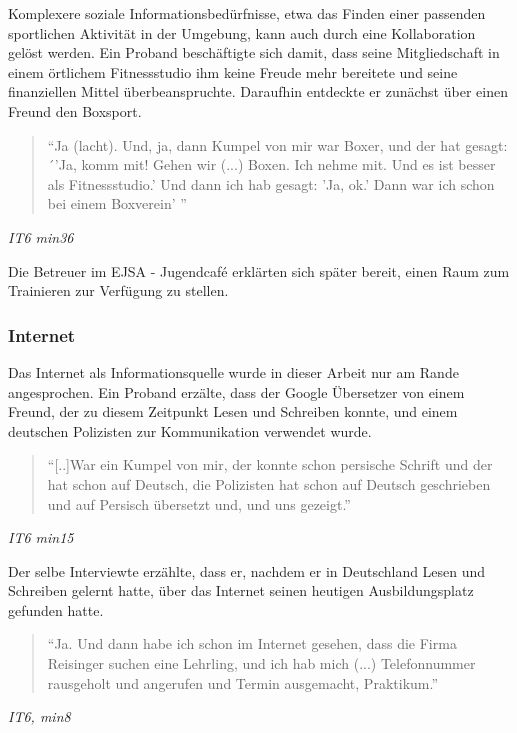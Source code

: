 Komplexere soziale Informationsbedürfnisse, etwa das Finden einer passenden sportlichen Aktivität in der Umgebung, kann auch durch eine Kollaboration gelöst werden. Ein Proband beschäftigte sich damit, dass seine Mitgliedschaft in einem örtlichem Fitnessstudio  ihm keine Freude mehr bereitete und seine finanziellen Mittel überbeanspruchte. Daraufhin entdeckte er zunächst über einen Freund den Boxsport.
\begin{quote}
    ``Ja (lacht). Und, ja, dann Kumpel von mir war Boxer, und der hat gesagt: ´'Ja, komm mit! Gehen wir (...) Boxen. Ich nehme mit. Und es ist besser als Fitnessstudio.' Und dann ich hab gesagt: 'Ja, ok.' Dann war ich schon bei einem Boxverein' ''
\end{quote}
\centerline{\textit{IT6 min36}} 
Die Betreuer im EJSA - Jugendcafé erklärten sich später bereit, einen Raum zum Trainieren zur Verfügung zu stellen.

\subsubsection{Internet}

Das Internet als Informationsquelle wurde in dieser Arbeit nur am Rande angesprochen.  Ein Proband erzälte, dass der Google Übersetzer von einem Freund, der zu diesem Zeitpunkt Lesen und Schreiben konnte, und einem deutschen Polizisten zur Kommunikation verwendet wurde.
\begin{quote}
    ``[..]War ein Kumpel von mir, der konnte schon persische Schrift und der hat schon auf Deutsch, die Polizisten hat schon auf Deutsch geschrieben und auf Persisch übersetzt und, und uns gezeigt.''
\end{quote} 
\centerline{\textit{IT6 min15}}
Der selbe Interviewte erzählte, dass er, nachdem er in Deutschland Lesen und Schreiben gelernt hatte, über das Internet seinen heutigen Ausbildungsplatz gefunden hatte.
\begin{quote}
    ``Ja. Und dann habe ich schon im Internet gesehen, dass die Firma Reisinger suchen eine Lehrling, und ich hab mich (...) Telefonnummer rausgeholt und angerufen und Termin ausgemacht, Praktikum.''
\end{quote}
\centerline{\textit{IT6, min8}}